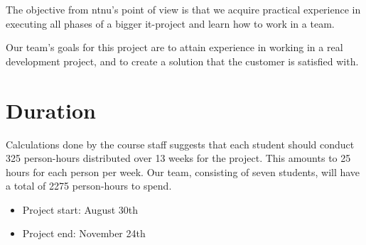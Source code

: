The objective from \Gls{ntnu}'s point of view is that we acquire practical experience in executing all phases of a bigger \Gls{it}-project and learn
how to work in a team.

Our team's goals for this project are to attain experience in working in a real development project, and to create a solution that the customer
is satisfied with.

\section{Duration}
Calculations done by the course staff suggests that each student should conduct 325 person-hours distributed over 13 weeks for the project.
This amounts to 25 hours for each person per week. Our team, consisting of seven students, will have a total of 2275 person-hours to spend.\\
\begin {itemize}
	\item Project start: August 30th
	\item Project end: November 24th
\end{itemize}

